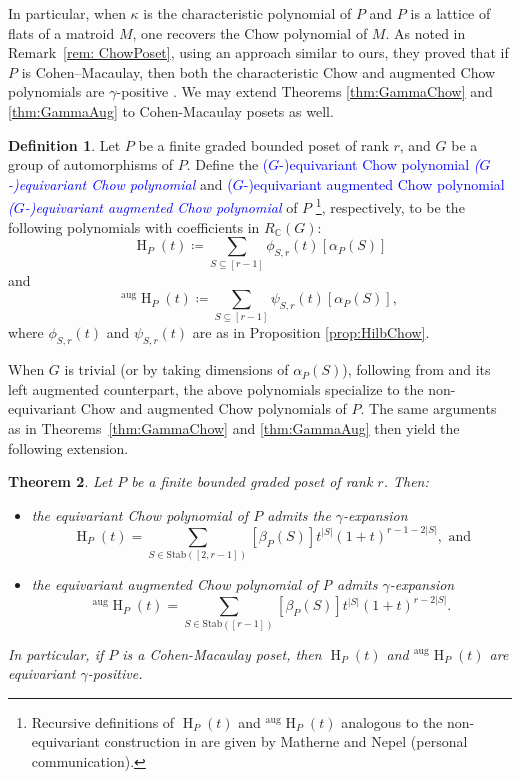 \documentclass[reqno]{amsart}
\newcommand{\defin}[1]{%
\relax\ifmmode%
\textcolor{blue}{#1}%
\else\textcolor{blue}{\emph{#1}}%
\fi%
}
\newcommand{\Stab}{{\mathrm{Stab}}}
\newtheorem{thm}{Theorem}[section]
\theoremstyle{definition}
\newtheorem{defi}[thm]{Definition}
\theoremstyle{remark}
\begin{document}
In particular, when $\kappa$ is the characteristic polynomial of $P$ and $P$ is a lattice of flats of a matroid $M$, one recovers the Chow polynomial of $M$.
As noted in Remark~\ref{rem: ChowPoset}, using an approach similar to ours, they proved that if $P$ is Cohen--Macaulay, then both the characteristic Chow and augmented Chow polynomials are $\gamma$-positive \cite[Theorem 4.25]{FMVChowPoly}. 
We may extend Theorems \ref{thm:GammaChow} and \ref{thm:GammaAug} to Cohen-Macaulay posets as well.

\begin{defi} \label{def: EqChowDef}
Let $P$ be a finite graded bounded poset of rank $r$, and $G$ be a group of automorphisms of $P$. Define the \defin{($G$-)equivariant Chow polynomial} and \defin{($G$-)equivariant augmented Chow polynomial} of $P$
\footnote{Recursive definitions of $\operatorname{H}_P(t)$ and $^{\mathrm{aug}}\operatorname{H}_P(t)$ analogous to the non-equivariant construction in \cite{Ferroni2024hilbert} are given by Matherne and Nepel (personal communication).},
respectively, to be the following polynomials with coefficients in $R_{\mathbb{C}}(G)$:
\[
    \operatorname{H}_P(t)\coloneqq \sum_{S\subseteq [r-1]}\phi_{S,r}(t)[\alpha_{P}(S)]
\]
and 
\[
    ^{\mathrm{aug}}\operatorname{H}_P(t)\coloneqq \sum_{S\subseteq [r-1]}\psi_{S,r}(t)[\alpha_{P}(S)],
\]
where $\phi_{S,r}(t)$ and $\psi_{S,r}(t)$ are as in Proposition \ref{prop:HilbChow}.
\end{defi}
When $G$ is trivial (or by taking dimensions of $\alpha_P(S)$), following from \cite[Theorem 4.1]{FMVChowPoly} and its left augmented counterpart, the above polynomials specialize to the non-equivariant Chow and augmented Chow polynomials of $P$.
The same arguments as in Theorems~\ref{thm:GammaChow} and \ref{thm:GammaAug} then yield the following extension.

\begin{thm}
Let $P$ be a finite bounded graded poset of rank $r$. 
Then:
\begin{itemize}
    \item[(i)] the equivariant Chow polynomial of $P$ admits the $\gamma$-expansion
    \[
        \operatorname{H}_P(t)=\sum_{S\in\Stab([2,r-1])}[\beta_{P}(S)] t^{|S|}(1+t)^{r-1-2|S|}, \text{ and}
    \]
    \item[(ii)] the equivariant augmented Chow polynomial of P admits $\gamma$-expansion
    \[
    ^{\mathrm{aug}}\operatorname{H}_P(t)=\sum_{S\in\Stab([r-1])}[\beta_{P}(S)] t^{|S|}(1+t)^{r-2|S|}.
    \]
\end{itemize}
In particular, if $P$ is a Cohen-Macaulay poset, then $\operatorname{H}_P(t)$ and $^{\mathrm{aug}}\operatorname{H}_P(t)$ are equivariant $\gamma$-positive.
\end{thm}
\end{document}

